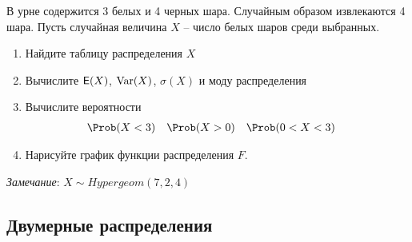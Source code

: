 \begin{exercise}
В урне содержится 3 белых и 4 черных шара. Случайным образом извлекаются
4 шара. Пусть случайная величина \(X\) -- число белых шаров среди выбранных.
\begin{enumerate}
	\item Найдите таблицу распределения \(X\)
	\item Вычислите \({\mathsf E}(X)\), \(\operatorname{Var}(X)\), \(\sigma(X)\) и моду распределения
	\item Вычислите вероятности
	\begin{align*}
		&\Prob(X<3) & &\Prob(X>0) & &\Prob(0<X<3)
	\end{align*}
	\item Нарисуйте график функции распределения \(F\).
\end{enumerate}
\textit{Замечание}: \(X\sim Hypergeom(7,2,4)\)
\end{exercise}

\subsection{Двумерные распределения}

